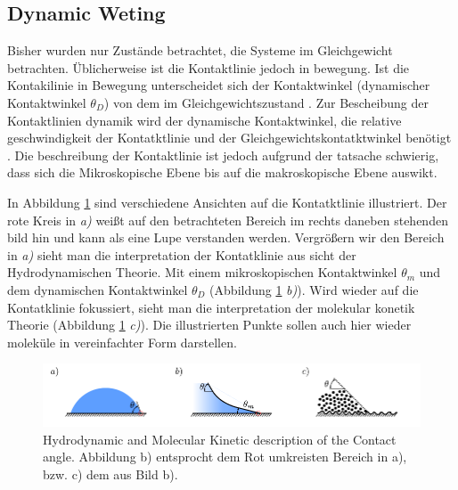 \subsection{Dynamic Weting}
Bisher wurden nur Zustände betrachtet, die Systeme im Gleichgewicht betrachten. Üblicherweise ist die Kontaktlinie jedoch in bewegung. Ist die Kontakilinie in Bewegung unterscheidet sich der Kontaktwinkel (dynamischer Kontaktwinkel $\theta_D$) von dem im Gleichgewichtszustand \cite{blake2006PhysicsMovingWetting}. Zur Bescheibung der Kontaktlinien dynamik wird der dynamische Kontaktwinkel, die relative geschwindigkeit der Kontatktlinie und der Gleichgewichtskontatktwinkel benötigt \cite{mohammadkarim2022ReviewPhysicsMoving, blake2006PhysicsMovingWetting, cox1986DynamicsSpreadingLiquids,huh1971HydrodynamicModelSteady,voinovHydrodynamicsWetting1977}.
Die beschreibung der Kontaktlinie ist jedoch aufgrund der tatsache schwierig, dass sich die Mikroskopische Ebene bis auf die makroskopische Ebene auswikt. 



In Abbildung \ref{fig: HDT_MKT_comp} sind verschiedene Ansichten auf die Kontatktlinie illustriert. Der rote Kreis in \textit{a)} weißt auf den betrachteten Bereich im rechts daneben stehenden bild hin und kann als eine Lupe verstanden werden. Vergrößern wir den Bereich in  \textit{a)} sieht man die interpretation der Kontatklinie aus sicht der Hydrodynamischen Theorie. Mit einem mikroskopischen Kontaktwinkel $\theta_m$ und dem dynamischen Kontaktwinkel $\theta_D$ (Abbildung \ref{fig: HDT_MKT_comp} \textit{b)}). Wird wieder auf die Kontatklinie fokussiert, sieht man die interpretation der molekular konetik Theorie (Abbildung \ref{fig: HDT_MKT_comp} \textit{c)}). Die illustrierten Punkte sollen auch hier wieder moleküle in vereinfachter Form darstellen. 



\begin{figure}[h]
    \centering
    \includegraphics[width=.95\textwidth]{Pictures/ContactAngles_HDT_MKT.pdf}
    \caption{Hydrodynamic and Molecular Kinetic description of the Contact angle. Abbildung b) entsprocht dem Rot umkreisten Bereich in a), bzw. c) dem aus Bild b).}
    \label{fig: HDT_MKT_comp}
\end{figure}
